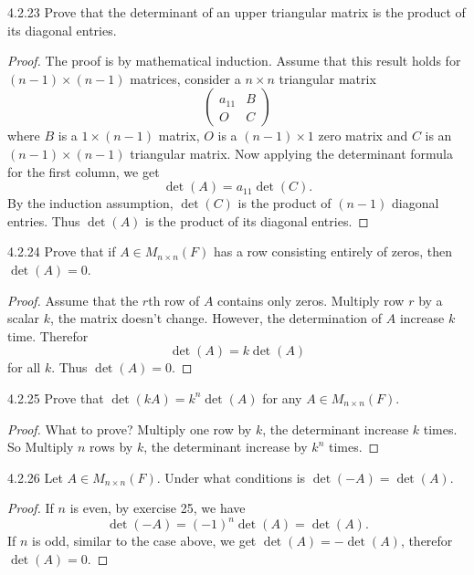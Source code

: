 \documentclass[12pt, a4paper]{article}
\theoremstyle{plain}
\begin{document}
\begin{exercise}{4.2.23}
Prove that the determinant of an upper triangular matrix is the product of its diagonal entries.
\end{exercise}
	\begin{proof}
	The proof is by mathematical induction. Assume that this result holds for $(n-1)\times (n-1)$ matrices, consider a $n\times n$ triangular matrix
	\[
	\begin{pmatrix}
	a_11 & B\\
	O & C
	\end{pmatrix}
	\]
	where $B$ is a $1\times (n-1)$ matrix, $O$ is a $(n-1)\times 1$ zero matrix and $C$ is an $(n-1)\times (n-1)$ triangular matrix. Now applying the determinant formula for the first column, we get 
	\[
	\det(A)=a_{11} \det(C).
	\]
	By the induction assumption, $\det(C)$ is the product of $(n-1)$ diagonal entries. Thus $\det(A)$ is the product of its diagonal entries.
	\end{proof}

\begin{exercise}{4.2.24}
Prove that if $A\in M_{n\times n}(F)$ has a row consisting entirely of zeros, then $\det(A)=0$.
\end{exercise}
	\begin{proof}
	Assume that the $r$th row of $A$ contains only zeros. Multiply row $r$ by a scalar $k$, the matrix doesn't change. However, the determination of $A$ increase $k$ time. Therefor
	\[
	\det(A)=k\det(A)
	\]
	for all $k$. Thus $\det(A)=0$.
	\end{proof}
	
\begin{exercise}{4.2.25}
Prove that $\det(kA)=k^n\det(A)$ for any $A\in M_{n\times n}(F)$.
\end{exercise}
	\begin{proof}
	What to prove? Multiply one row by $k$, the determinant increase $k$ times. So Multiply $n$ rows by $k$, the determinant increase by $k^n$ times.
	\end{proof}
	
\begin{exercise}{4.2.26}
Let $A\in M_{n\times n}(F)$. Under what conditions is $\det(-A)=\det(A)$.
\end{exercise}
	\begin{proof}
	If $n$ is even, by exercise 25, we have
	\[
	\det(-A)=(-1)^{n}\det(A)=\det(A).
	\]
	If $n$ is odd, similar to the case above, we get $\det(A)=-\det(A)$, therefor $\det(A)=0$. 
	\end{proof}
	
\end{document}
